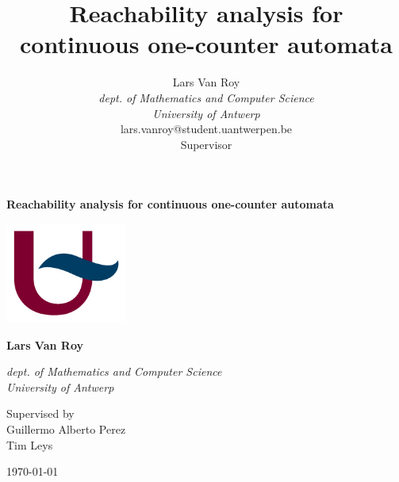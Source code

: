 \documentclass[12pt]{thesis}
\title{Reachability analysis for continuous one-counter automata}
\author{Lars Van Roy\\
\textit{dept. of Mathematics and Computer Science} \\
\textit{University of Antwerp}\\
lars.vanroy@student.uantwerpen.be\\
\vspace*{10em}
Supervisor}
\begin{document}
	
\begin{titlepage}
	\begin{center}
		\vspace*{1cm}
		
		{\Large\textbf{Reachability analysis for continuous one-counter automata}}
		
		\vspace{1.5cm}
		
		\includegraphics[width=0.3\textwidth]{ua.jpg}
		
		\vspace{1.5cm}
		
		\textbf{Lars Van Roy}
		
		\vspace{0.5cm}
		
		\textit{dept. of Mathematics and Computer Science} \\
		\textit{University of Antwerp}
		
		\vspace{3cm}
		Supervised by \\
		Guillermo Alberto Perez \\
		Tim Leys
		
		\vspace{2cm}
		\monthyeardate\today
	\end{center}
\end{titlepage}
\end{document}
